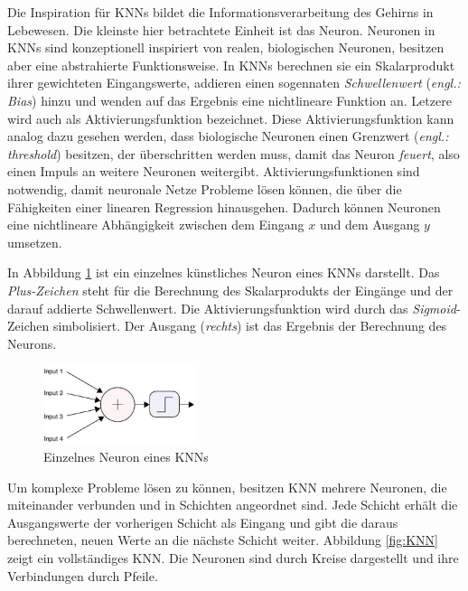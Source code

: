 Die Inspiration für \acp{KNN} bildet die Informationsverarbeitung des Gehirns in Lebewesen. Die kleinste hier betrachtete Einheit ist das Neuron. Neuronen in \acp{KNN} sind konzeptionell inspiriert von realen, biologischen Neuronen, besitzen aber eine abstrahierte Funktionsweise. In \acp{KNN} berechnen sie ein Skalarprodukt ihrer gewichteten Eingangswerte, addieren einen sogennaten \emph{Schwellenwert} (\emph{engl.: Bias}) hinzu und wenden auf das Ergebnis eine nichtlineare Funktion an. Letzere wird auch als Aktivierungsfunktion bezeichnet. 
Diese Aktivierungsfunktion kann analog dazu gesehen werden, dass biologische Neuronen einen Grenzwert (\emph{engl.: threshold}) besitzen, der überschritten werden muss, damit das Neuron \emph{feuert}, also einen Impuls an weitere Neuronen weitergibt. Aktivierungsfunktionen sind notwendig, damit neuronale Netze Probleme lösen können, die über die Fähigkeiten einer linearen Regression hinausgehen. Dadurch können Neuronen eine nichtlineare Abhängigkeit zwischen dem Eingang $x$ und dem Ausgang $y$ umsetzen. \cite{visualApproach}

In Abbildung \ref{fig:neuron} ist ein einzelnes künstliches Neuron eines \acp{KNN} darstellt. Das \emph{Plus-Zeichen} steht für die Berechnung des Skalarprodukts der Eingänge und der darauf addierte Schwellenwert. Die Aktivierungsfunktion wird durch das \emph{Sigmoid}-Zeichen simbolisiert. Der Ausgang (\emph{rechts}) ist das Ergebnis der Berechnung des Neurons. \cite{visualApproach}

\begin{figure}[H]
   \centering
   \includegraphics[width=0.4\textwidth]{images/KNNs/Neuron.png}
   \caption{Einzelnes Neuron eines \acp{KNN} \cite{visualApproach}}
   \label{fig:neuron}
\end{figure}

Um komplexe Probleme lösen zu können, besitzen \ac{KNN} mehrere Neuronen, die miteinander verbunden und in Schichten angeordnet sind. Jede Schicht erhält die Ausgangswerte der vorherigen Schicht als Eingang und gibt die daraus berechneten, neuen Werte an die nächste Schicht weiter. Abbildung \ref{fig:KNN} zeigt ein vollständiges \ac{KNN}. Die Neuronen sind durch Kreise dargestellt und ihre Verbindungen durch Pfeile. \cite{knnsKompakt} 

